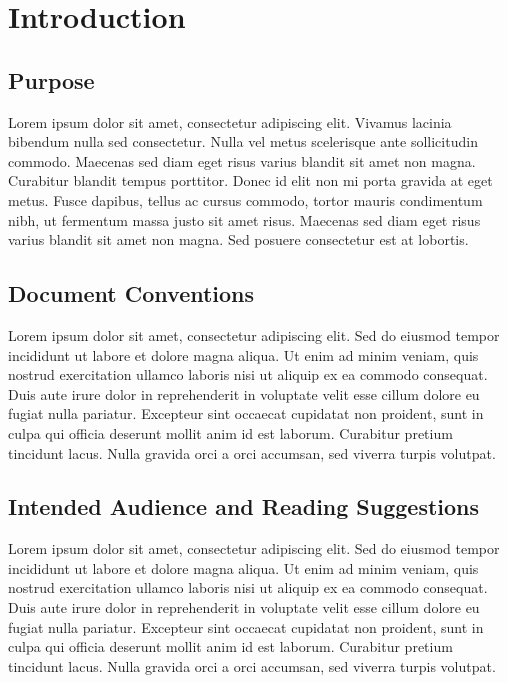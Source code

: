 
\section{Introduction}

\subsection{Purpose}
Lorem ipsum dolor sit amet, consectetur adipiscing elit. Vivamus lacinia bibendum nulla sed consectetur. Nulla vel metus scelerisque ante sollicitudin commodo. Maecenas sed diam eget risus varius blandit sit amet non magna. Curabitur blandit tempus porttitor. Donec id elit non mi porta gravida at eget metus. Fusce dapibus, tellus ac cursus commodo, tortor mauris condimentum nibh, ut fermentum massa justo sit amet risus. Maecenas sed diam eget risus varius blandit sit amet non magna. Sed posuere consectetur est at lobortis.

\subsection{Document Conventions}
Lorem ipsum dolor sit amet, consectetur adipiscing elit. Sed do eiusmod tempor incididunt ut labore et dolore magna aliqua. Ut enim ad minim veniam, quis nostrud exercitation ullamco laboris nisi ut aliquip ex ea commodo consequat. Duis aute irure dolor in reprehenderit in voluptate velit esse cillum dolore eu fugiat nulla pariatur. Excepteur sint occaecat cupidatat non proident, sunt in culpa qui officia deserunt mollit anim id est laborum. Curabitur pretium tincidunt lacus. Nulla gravida orci a orci accumsan, sed viverra turpis volutpat.

\subsection{Intended Audience and Reading Suggestions}
Lorem ipsum dolor sit amet, consectetur adipiscing elit. Sed do eiusmod tempor incididunt ut labore et dolore magna aliqua. Ut enim ad minim veniam, quis nostrud exercitation ullamco laboris nisi ut aliquip ex ea commodo consequat. Duis aute irure dolor in reprehenderit in voluptate velit esse cillum dolore eu fugiat nulla pariatur. Excepteur sint occaecat cupidatat non proident, sunt in culpa qui officia deserunt mollit anim id est laborum. Curabitur pretium tincidunt lacus. Nulla gravida orci a orci accumsan, sed viverra turpis volutpat.

